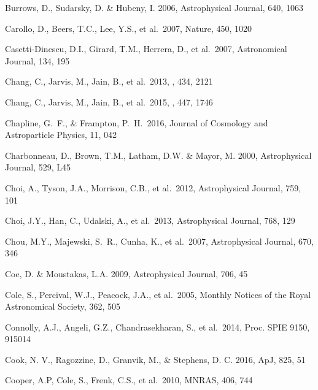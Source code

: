 \documentclass[twocolumn]{aastex61}
\begin{document}
\begin{thebibliography}{}
 Burrows, D., Sudarsky, D. \& Hubeny, I. 2006, Astrophysical Journal, 640, 1063

 Carollo, D., Beers, T.C., Lee, Y.S., et al.~2007, Nature, 450, 1020

 Casetti-Dinescu, D.I., Girard, T.M., Herrera, D., et al.~2007, Astronomical Journal, 134, 195

 Chang, C., Jarvis, M., Jain, B., et al.\ 2013, \mnras, 434, 2121

 Chang, C., Jarvis, M., Jain, B., et al.\ 2015, \mnras, 447, 1746

 Chapline, G.~F., \& Frampton, P.~H.\ 2016, Journal of Cosmology and Astroparticle Physics, 11, 042

 Charbonneau, D., Brown, T.M., Latham, D.W. \& Mayor, M. 2000, Astrophysical Journal, 529, L45

 Choi, A., Tyson, J.A., Morrison, C.B., et al.~2012, Astrophysical Journal, 759, 101

 Choi, J.Y., Han, C., Udalski, A., et al.~2013, Astrophysical Journal, 768, 129

 Chou, M.Y., Majewski, S.~R., Cunha, K., et al.~2007, Astrophysical Journal, 670, 346

 Coe, D. \& Moustakas, L.A. 2009, Astrophysical Journal, 706, 45

 Cole, S., Percival, W.J., Peacock, J.A., et al.~2005, Monthly Notices of the Royal Astronomical Society, 362, 505

 Connolly, A.J., Angeli, G.Z., Chandrasekharan, S., et al.~2014, Proc. SPIE 9150, 915014

 Cook, N. V., Ragozzine, D., Granvik, M., \& Stephens, D. C. 2016, ApJ, 825, 51

 Cooper, A.P, Cole, S., Frenk, C.S., et al.~2010, MNRAS, 406, 744


\end{thebibliography}
\end{document}
